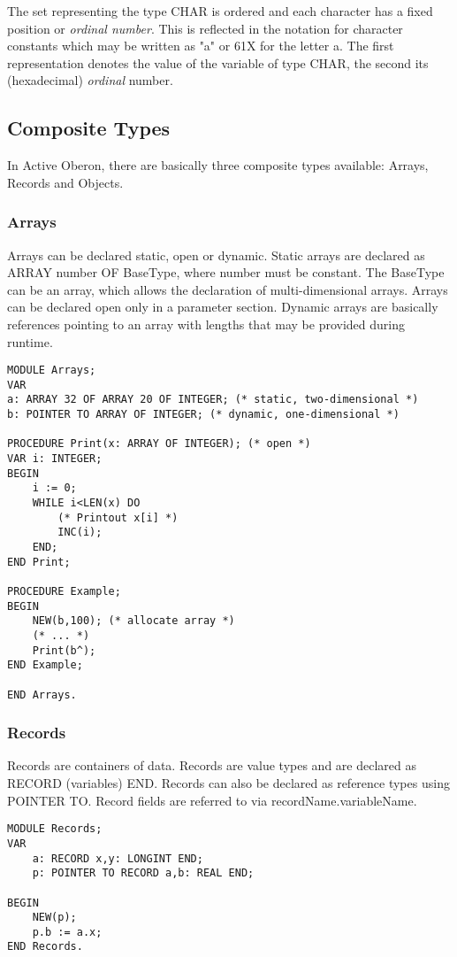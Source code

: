 \documentclass[a4paper,11pt]{article}
\begin{document}
The set representing the type CHAR is ordered and each character has a fixed position or {\em ordinal number}. This is reflected in the notation for character constants which may be written as "a" or 61X for the letter a. The first representation denotes the value of the variable of type CHAR, the second its (hexadecimal) {\em ordinal} number.

\subsection{Composite Types}\label{section:CompositeTypes}

In Active Oberon, there are basically three composite types available: Arrays, Records and Objects.

\subsubsection{Arrays}\label{section:Arrays}
Arrays can be declared static, open or dynamic. Static arrays are declared as ARRAY number OF BaseType, where number must be constant. The BaseType can be an array, which allows the declaration of multi-dimensional arrays. Arrays can be declared open only in a parameter section. Dynamic arrays are basically references pointing to an array with lengths that may be provided during runtime.

\begin{lstlisting}[language=Oberon,frame=none,caption=Using arrays]
MODULE Arrays;
VAR
a: ARRAY 32 OF ARRAY 20 OF INTEGER; (* static, two-dimensional *)
b: POINTER TO ARRAY OF INTEGER; (* dynamic, one-dimensional *)

PROCEDURE Print(x: ARRAY OF INTEGER); (* open *)
VAR i: INTEGER;
BEGIN
    i := 0;
    WHILE i<LEN(x) DO
        (* Printout x[i] *)
        INC(i);
    END;
END Print;

PROCEDURE Example;
BEGIN
    NEW(b,100); (* allocate array *)
    (* ... *)
    Print(b^);
END Example;

END Arrays.
\end{lstlisting}

\subsubsection{Records}\label{section:Records}
Records are containers of data. Records are value types and are declared as RECORD (variables) END. Records can also be declared as reference types using POINTER TO. Record fields are referred to via recordName.variableName.
\begin{lstlisting}[language=Oberon,frame=none,caption=Using records]
MODULE Records;
VAR
    a: RECORD x,y: LONGINT END;
    p: POINTER TO RECORD a,b: REAL END;

BEGIN
    NEW(p);
    p.b := a.x;
END Records.
\end{lstlisting}
\end{document}
